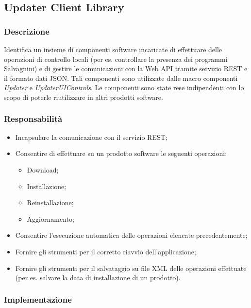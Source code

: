 \documentclass[../RelazioneFinale.tex]{subfiles}
\begin{document}
\newpage
	
		\subsection{Updater Client Library}
		
			\subsubsection{Descrizione}
				Identifica un insieme di componenti software incaricate di effettuare delle operazioni di controllo locali (per es. controllare la presenza dei programmi Salvagnini) e di gestire le comunicazioni con la Web API tramite servizio REST e il formato dati JSON. Tali componenti sono utilizzate dalle macro componenti \emph{Updater} e \emph{UpdaterUIControls}.
			Le componenti sono state rese indipendenti con lo scopo di poterle riutilizzare in altri prodotti software.
			
			\subsubsection{Responsabilità}
				\begin{itemize}
					\item Incapsulare la comunicazione con il servizio REST;
					\item Consentire di effettuare su un prodotto software le seguenti operazioni:
					\begin{itemize}
						\item Download;
						\item Installazione;
						\item Reinstallazione;
						\item Aggiornamento;
					\end{itemize}
					\item Consentire l'esecuzione automatica delle operazioni elencate precedentemente;
					\item Fornire gli strumenti per il corretto riavvio dell'applicazione;
					\item Fornire gli strumenti per il salvataggio su file XML delle operazioni effettuate (per es. salvare la data di installazione di un prodotto).
				\end{itemize}
			
			\subsubsection{Implementazione}
			
\end{document}
